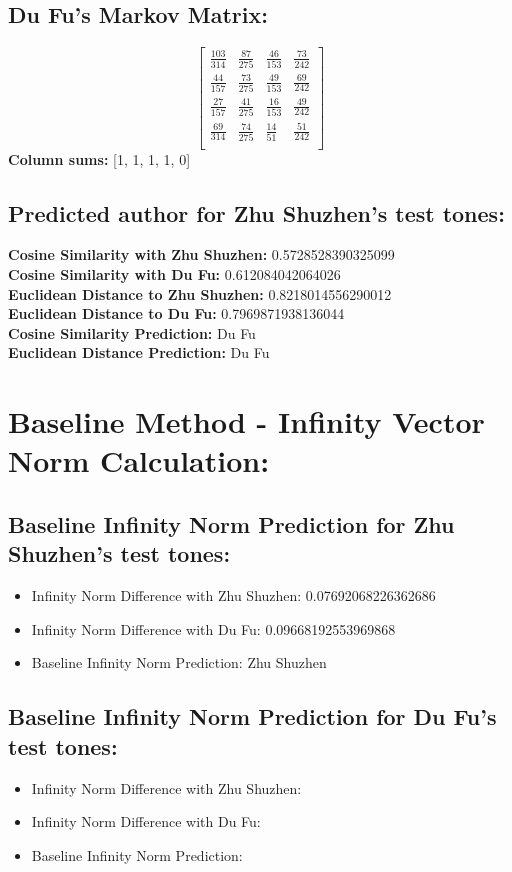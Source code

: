 \documentclass[12pt]{article}
\begin{document}
\subsection*{Du Fu's Markov Matrix:}
\[
\begin{bmatrix}
    \frac{103}{314} & \frac{87}{275} & \frac{46}{153} & \frac{73}{242} \\
    \frac{44}{157} & \frac{73}{275} & \frac{49}{153} & \frac{69}{242} \\
    \frac{27}{157} & \frac{41}{275} & \frac{16}{153} & \frac{49}{242}  \\
    \frac{69}{314} & \frac{74}{275} & \frac{14}{51} & \frac{51}{242}  \\
\end{bmatrix}
\]
\textbf{Column sums:} [1, 1, 1, 1, 0]

\subsection*{Predicted author for Zhu Shuzhen's test tones:}
\textbf{Cosine Similarity with Zhu Shuzhen:} 0.5728528390325099
\\
\textbf{Cosine Similarity with Du Fu:} 0.612084042064026
\\
\textbf{Euclidean Distance to Zhu Shuzhen:} 0.8218014556290012
\\
\textbf{Euclidean Distance to Du Fu:} 0.7969871938136044
\\
\textbf{Cosine Similarity Prediction:} Du Fu
\\
\textbf{Euclidean Distance Prediction:} Du Fu

\section*{Baseline Method - Infinity Vector Norm Calculation: }
\subsection*{Baseline Infinity Norm Prediction for Zhu Shuzhen's test tones:}

\begin{itemize}
    \item Infinity Norm Difference with Zhu Shuzhen: 0.07692068226362686
    \item Infinity Norm Difference with Du Fu:  0.09668192553969868
    \item Baseline Infinity Norm Prediction: Zhu Shuzhen
\end{itemize}

\subsection*{Baseline Infinity Norm Prediction for Du Fu's test tones:}

\begin{itemize}
    \item Infinity Norm Difference with Zhu Shuzhen: 
    \item Infinity Norm Difference with Du Fu: 
    \item Baseline Infinity Norm Prediction: 
\end{itemize}
\end{document}
